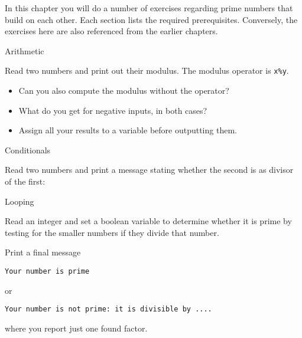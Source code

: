 
In this chapter you will do a number of exercises regarding prime
numbers that build on each other. Each section lists the required
prerequisites. Conversely, the exercises here are also referenced from
the earlier chapters.

 {Arithmetic}


\begin{exercise}
  \label{ex:prime:modvar}
  Read two numbers and print out their modulus.
  The modulus operator is \verb+x%y+.
  \begin{itemize}
  \item
    Can you also compute the modulus without the operator?
  \item What do you get for negative inputs, in both cases?
  \item Assign all your results to a variable before outputting them.
  \end{itemize}
\end{exercise}
 {Conditionals}


\begin{exercise}
  \label{ex:prime:divtest}
  Read two numbers and print a message stating
  whether the second is as divisor of the first:
\end{exercise}

 {Looping}
\label{sec:prime-loop}


\begin{exercise}
  \label{ex:prime:test}
  Read an integer and set a boolean variable to
  determine whether it is prime by testing for the
  smaller numbers if they divide that number. 

  Print a final message
\begin{verbatim}
Your number is prime
\end{verbatim}
or
\begin{verbatim}
Your number is not prime: it is divisible by ....
\end{verbatim}
where you report just one found factor.
\end{exercise}

